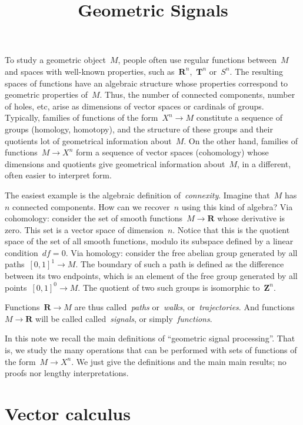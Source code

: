 \title{Geometric Signals}



\newcommand{\1}{\mathbf{1}}
\newcommand{\R}{\mathbf{R}}
\newcommand{\T}{\mathbf{T}}
\newcommand{\Z}{\mathbf{Z}}
\newcommand{\ud}{\mathrm{d}}
\newcommand{\ds}{\displaystyle}

To study a geometric object~$M$, people often use regular functions
between~$M$ and spaces with well-known properties, such as~$\R^n$,~$\T^n$
or~$S^n$.  The resulting spaces of functions have an algebraic structure
whose properties correspond to geometric properties of~$M$.
Thus, the number of connected components, number of holes, etc, arise as
dimensions of vector spaces or cardinals of groups.
Typically,
families of functions of the form~$X^n\to M$ constitute a sequence of groups
(homology, homotopy), and the structure of these groups and their quotients
 lot of geometrical information about~$M$.  On the other hand,
families of functions~$M\to X^n$ form a sequence of vector spaces
(cohomology) whose dimensions and quotients give geometrical information
about~$M$, in a different, often easier to interpret form.

The easiest example is the algebraic definition of~\emph{connexity}.  Imagine
that~$M$ has~$n$ connected components.  How can we recover~$n$ using this kind
of algebra?
%
Via cohomology: consider the set of smooth functions~$M\to\R$ whose
derivative is zero.  This set is a vector space of dimension~$n$.
Notice that this is the quotient space of the set of all smooth functions,
modulo its subspace defined by a linear condition~$df=0$.
%
Via homology: consider the free abelian group generated by all
paths~$[0,1]^1\to M$.  The boundary of such a path is defined as the difference
between its two endpoints, which is an element of the free group generated by
all points~$[0,1]^0\to M$.  The quotient of two such groups is isomorphic
to~$\Z^n$.

Functions~$\R\to M$ are thus called~\emph{paths} or~\emph{walks},
or~\emph{trajectories}.  And functions~$M\to\R$ will be called
called~\emph{signals}, or simply~\emph{functions}.

In this note we recall the main definitions of ``geometric signal
processing''. That is, we study the many operations that can be performed with
sets of functions of the form~$M\to X^n$.  We just give the definitions and
the main main results; no proofs nor lengthy interpretations.


\clearpage
\section{Vector calculus}

